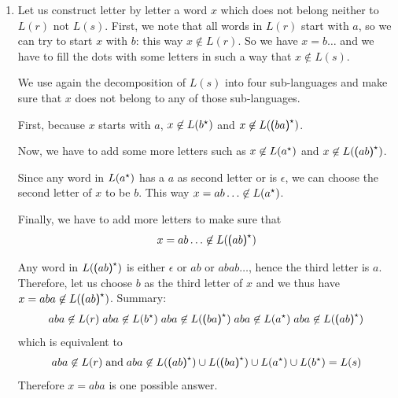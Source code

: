\begin{enumerate}
\begin{enumerate}
      \end{enumerate}
      Finally, since all the four equations are false, they
        imply that \[L(r) \cap L(s) = \varnothing.\]

    \item Let us construct letter by letter a word \(x\) which
      does not belong neither to \(L(r)\) not \(L(s)\). First, we note
      that all words in \(L(r)\) start with \(a\), so we can try to
      start \(x\) with \(b\): this way \(x \not\in L(r)\). So we have
      \(x = b\ldots\) and we have to fill the dots with some letters
      in such a way that \(x \not\in L(s)\).

      \smallskip

      We use again the decomposition of \(L(s)\) into four
      sub-languages and make sure that \(x\) does not belong to any of
      those sub-languages.

      \smallskip

      First, because \(x\) starts with \(a\), \(x \not\in
      L(b^{\star})\) and \(x \not\in L(\textsf{(} ba \textsf{)}^{\star})\).

      \smallskip

      Now, we have to add some more letters such as \(x \not\in
      L(a^{\star})\) and \(x \not\in L(\textsf{(} ab \textsf{)}^{\star})\).

      \smallskip

      Since any word in \(L(a^{\star})\) has a \(a\) as second letter
      or is \(\epsilon\), we can choose the second letter of \(x\) to
      be \(b\). This way \(x=ab\ldots \not\in L(a^{\star})\).

      \smallskip

      Finally, we have to add more letters to make sure that
      \[x=ab\ldots \not\in L(\textsf{(} ab\textsf{)}^{\star})\]

      \smallskip

      Any word in \(L(\textsf{(} ab\textsf{)}^{\star})\) is either
      \(\epsilon\) or \(ab\) or \(abab\ldots\), hence the third letter
      is \(a\). Therefore, let us choose \(b\) as the third letter of
      \(x\) and we thus have \(x=aba \not\in L(\textsf{(}
      ab\textsf{)}^{\star})\). Summary:
      \[
        aba \not\in L(r) \;
        aba \not\in L(b^{\star}) \;
        aba \not\in L(\textsf{(} ba\textsf{)}^{\star}) \;
        aba \not\in L(a^{\star}) \;
        aba \not\in L(\textsf{(} ab\textsf{)}^{\star})
      \]
      \noindent which is equivalent to
      \[
        aba \not\in L(r) \; \text{and} \; aba \not\in L(\textsf{(} ab
        \textsf{)}^{\star}) \cup L(\textsf{(} ba \textsf{)}^{\star}) \cup
        L(a^{\star}) \cup L(b^{\star}) = L(s)
      \]
      Therefore \(x=aba\) is one possible answer.

\end{enumerate}
